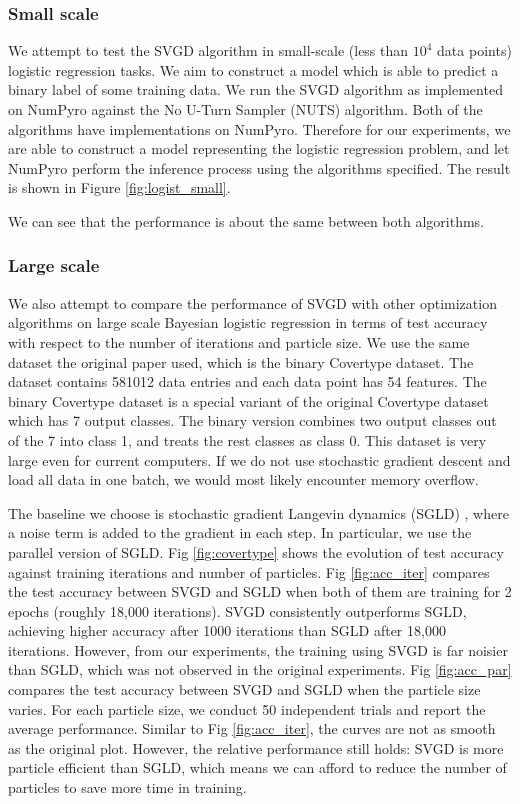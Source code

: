 \subsubsection{Small scale}
We attempt to test the SVGD algorithm in small-scale (less than $10^4$ data points) logistic regression tasks. We aim to construct a model which is able to predict a binary label of some training data. We run the SVGD algorithm as implemented on NumPyro against the No U-Turn Sampler (NUTS) algorithm. Both of the algorithms have implementations on NumPyro. Therefore for our experiments, we are able to construct a model representing the logistic regression problem, and let NumPyro perform the inference process using the algorithms specified. The result is shown in Figure \ref{fig:logist_small}.

We can see that the performance is about the same between both algorithms. 

\subsubsection{Large scale}
We also attempt to compare the performance of SVGD with other optimization algorithms on large scale Bayesian logistic regression in terms of test accuracy with respect to the number of iterations and particle size. We use the same dataset the original paper used, which is the binary Covertype dataset. The dataset contains 581012 data entries and each data point has 54 features. The binary Covertype dataset is a special variant of the original Covertype dataset which has 7 output classes. The binary version combines two output classes out of the 7 into class 1, and treats the rest classes as class 0. This dataset is very large even for current computers. If we do not use stochastic gradient descent and load all data in one batch, we would most likely encounter memory overflow. 

The baseline we choose is stochastic gradient Langevin dynamics (SGLD) \cite{ref_sgld}, where a noise term is added to the gradient in each step. In particular, we use the parallel version of SGLD. Fig \ref{fig:covertype} shows the evolution of test accuracy against training iterations and number of particles. Fig \ref{fig:acc_iter} compares the test accuracy between SVGD and SGLD when both of them are training for 2 epochs (roughly 18,000 iterations). SVGD consistently outperforms SGLD, achieving higher accuracy after 1000 iterations than SGLD after 18,000 iterations. However, from our experiments, the training using SVGD is far noisier than SGLD, which was not observed in the original experiments. Fig \ref{fig:acc_par} compares the test accuracy between SVGD and SGLD when the particle size varies. For each particle size, we conduct 50 independent trials and report the average performance. Similar to Fig \ref{fig:acc_iter}, the curves are not as smooth as the original plot. However, the relative performance still holds: SVGD is more particle efficient than SGLD, which means we can afford to reduce the number of particles to save more time in training.



